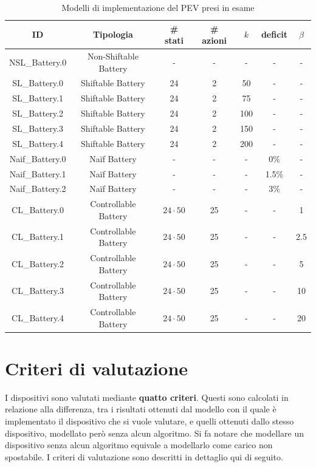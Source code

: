 \documentclass[italian, Lau, oneside]{sapthesis}
\begin{document}
\begin{table}[h]
    \center
    \caption{Modelli di implementazione del PEV presi in esame}
    \label{tab:modelli}
    \begin{tabular}{c|c|c|c|c|c|c}
        \hline
        \hline
        ID & Tipologia & \# stati & \# azioni & $k$ & deficit & $\beta$ \\
        \hline
        NSL\_Battery.0 & Non-Shiftable Battery & - & - & - & - & - \\
        \hline
        SL\_Battery.0 & Shiftable Battery & 24 & 2 & 50 & - & - \\
        \hline
        SL\_Battery.1 & Shiftable Battery & 24 & 2 & 75 & - & - \\
        \hline
        SL\_Battery.2 & Shiftable Battery & 24 & 2 & 100 & - & - \\
        \hline
        SL\_Battery.3 & Shiftable Battery & 24 & 2 & 150 & - & - \\
        \hline
        SL\_Battery.4 & Shiftable Battery & 24 & 2 & 200 & - & - \\
        \hline
        Naif\_Battery.0 & Naïf Battery & - & - & - & 0\% & - \\
        \hline
        Naif\_Battery.1 & Naïf Battery & - & - & - & 1.5\% & - \\
        \hline
        Naif\_Battery.2 & Naïf Battery & - & - & - & 3\% & - \\
        \hline
        CL\_Battery.0 & Controllable Battery & $24 \cdot 50$ & 25 & - & - & 1 \\
        \hline
        CL\_Battery.1 & Controllable Battery & $24 \cdot 50$ & 25 & - & - & 2.5 \\
        \hline
        CL\_Battery.2 & Controllable Battery & $24 \cdot 50$ & 25 & - & - & 5 \\
        \hline
        CL\_Battery.3 & Controllable Battery & $24 \cdot 50$ & 25 & - & - & 10 \\
        \hline
        CL\_Battery.4 & Controllable Battery & $24 \cdot 50$ & 25 & - & - & 20 \\
        \hline
        \hline
    \end{tabular}
\end{table}

\section{Criteri di valutazione}

I dispositivi sono valutati mediante \textbf{quatto criteri}. Questi sono calcolati in relazione alla differenza, tra i risultati ottenuti dal modello con il quale è implementato il dispositivo che si vuole valutare, e quelli ottenuti dallo stesso dispositivo, modellato però senza alcun algoritmo. Si fa notare che modellare un dispositivo senza alcun algoritmo equivale a modellarlo come carico non spostabile. I criteri di valutazione sono descritti in dettaglio qui di seguito.
\end{document}
